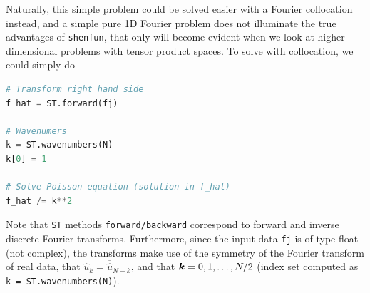 \documentclass[%
oneside,                 %
final,                   %
10pt]{article}
\theoremstyle{definition}
\begin{document}
Naturally, this simple problem could be solved easier with a Fourier collocation instead, and  a simple pure 1D Fourier problem does not illuminate the true advantages of  \texttt{shenfun}, that only will become evident when we look at higher dimensional problems with tensor product spaces. To solve with collocation, we could simply do
\begin{lstlisting}[language=Python,style=yellow2_fb]
# Transform right hand side
f_hat = ST.forward(fj)

# Wavenumers
k = ST.wavenumbers(N)
k[0] = 1

# Solve Poisson equation (solution in f_hat)
f_hat /= k**2
\end{lstlisting}

Note that \texttt{ST} methods \texttt{forward/backward} correspond to forward and inverse discrete Fourier transforms. Furthermore, since the input data \texttt{fj} is of type float (not complex), the transforms make use of the symmetry of the Fourier transform of real data, that $\hat{u}_k = \overline{\hat{u}}_{N-k}$, and that $\boldsymbol{k}=0,1,\ldots, N/2$ (index set computed as \texttt{k = ST.wavenumbers(N)}).
\end{document}

